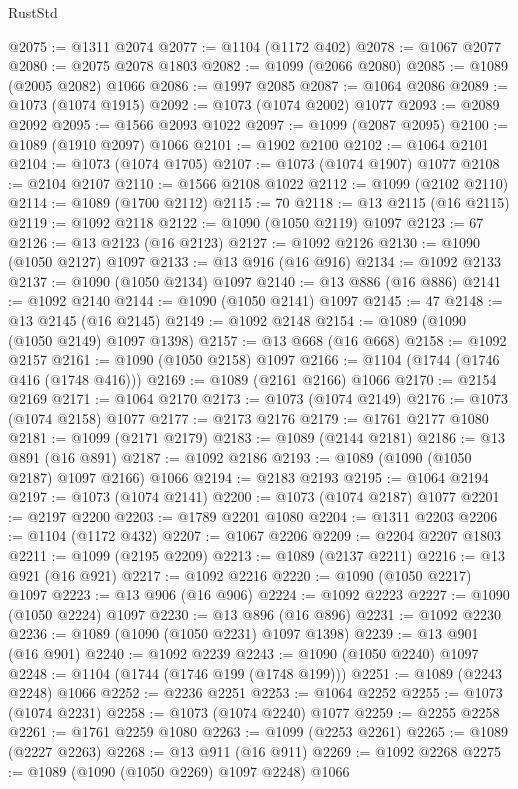 \begin{lexlean}{RustStd}
\begin{coremodule}
@2075 := @1311 @2074
@2077 := @1104 (@1172 @402)
@2078 := @1067 @2077
@2080 := @2075 @2078 @1803
@2082 := @1099 (@2066 @2080)
@2085 := @1089 (@2005 @2082) @1066
@2086 := @1997 @2085
@2087 := @1064 @2086
@2089 := @1073 (@1074 @1915)
@2092 := @1073 (@1074 @2002) @1077
@2093 := @2089 @2092
@2095 := @1566 @2093 @1022
@2097 := @1099 (@2087 @2095)
@2100 := @1089 (@1910 @2097) @1066
@2101 := @1902 @2100
@2102 := @1064 @2101
@2104 := @1073 (@1074 @1705)
@2107 := @1073 (@1074 @1907) @1077
@2108 := @2104 @2107
@2110 := @1566 @2108 @1022
@2112 := @1099 (@2102 @2110)
@2114 := @1089 (@1700 @2112)
@2115 := 70
@2118 := @13 @2115 (@16 @2115)
@2119 := @1092 @2118
@2122 := @1090 (@1050 @2119) @1097
@2123 := 67
@2126 := @13 @2123 (@16 @2123)
@2127 := @1092 @2126
@2130 := @1090 (@1050 @2127) @1097
@2133 := @13 @916 (@16 @916)
@2134 := @1092 @2133
@2137 := @1090 (@1050 @2134) @1097
@2140 := @13 @886 (@16 @886)
@2141 := @1092 @2140
@2144 := @1090 (@1050 @2141) @1097
@2145 := 47
@2148 := @13 @2145 (@16 @2145)
@2149 := @1092 @2148
@2154 := @1089 (@1090 (@1050 @2149) @1097 @1398)
@2157 := @13 @668 (@16 @668)
@2158 := @1092 @2157
@2161 := @1090 (@1050 @2158) @1097
@2166 := @1104 (@1744 (@1746 @416 (@1748 @416)))
@2169 := @1089 (@2161 @2166) @1066
@2170 := @2154 @2169
@2171 := @1064 @2170
@2173 := @1073 (@1074 @2149)
@2176 := @1073 (@1074 @2158) @1077
@2177 := @2173 @2176
@2179 := @1761 @2177 @1080
@2181 := @1099 (@2171 @2179)
@2183 := @1089 (@2144 @2181)
@2186 := @13 @891 (@16 @891)
@2187 := @1092 @2186
@2193 := @1089 (@1090 (@1050 @2187) @1097 @2166) @1066
@2194 := @2183 @2193
@2195 := @1064 @2194
@2197 := @1073 (@1074 @2141)
@2200 := @1073 (@1074 @2187) @1077
@2201 := @2197 @2200
@2203 := @1789 @2201 @1080
@2204 := @1311 @2203
@2206 := @1104 (@1172 @432)
@2207 := @1067 @2206
@2209 := @2204 @2207 @1803
@2211 := @1099 (@2195 @2209)
@2213 := @1089 (@2137 @2211)
@2216 := @13 @921 (@16 @921)
@2217 := @1092 @2216
@2220 := @1090 (@1050 @2217) @1097
@2223 := @13 @906 (@16 @906)
@2224 := @1092 @2223
@2227 := @1090 (@1050 @2224) @1097
@2230 := @13 @896 (@16 @896)
@2231 := @1092 @2230
@2236 := @1089 (@1090 (@1050 @2231) @1097 @1398)
@2239 := @13 @901 (@16 @901)
@2240 := @1092 @2239
@2243 := @1090 (@1050 @2240) @1097
@2248 := @1104 (@1744 (@1746 @199 (@1748 @199)))
@2251 := @1089 (@2243 @2248) @1066
@2252 := @2236 @2251
@2253 := @1064 @2252
@2255 := @1073 (@1074 @2231)
@2258 := @1073 (@1074 @2240) @1077
@2259 := @2255 @2258
@2261 := @1761 @2259 @1080
@2263 := @1099 (@2253 @2261)
@2265 := @1089 (@2227 @2263)
@2268 := @13 @911 (@16 @911)
@2269 := @1092 @2268
@2275 := @1089 (@1090 (@1050 @2269) @1097 @2248) @1066

\end{coremodule}
\end{lexlean}
